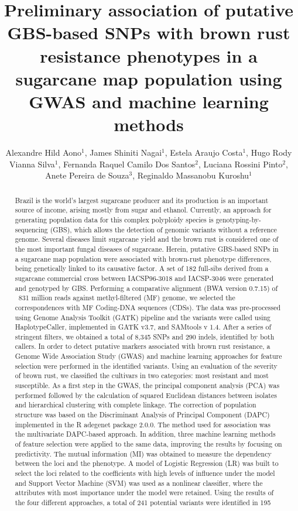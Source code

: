 \documentclass[twoside]{article}
\title{\vspace{-15mm}\fontsize{24pt}{10pt}\selectfont\textbf{Preliminary association of putative GBS-based SNPs with brown rust resistance phenotypes in a sugarcane map population using GWAS and machine learning methods}} %
\author{Alexandre Hild Aono$^1$, James Shiniti Nagai$^1$, Estela Araujo Costa$^1$, Hugo Rody Vianna Silva$^1$, Fernanda Raquel Camilo Dos Santos$^2$, Luciana Rossini Pinto$^2$, Anete Pereira de Souza$^3$, Reginaldo Massanobu Kuroshu$^1$}
\affil{1 UNIFESP\\ 2 INSTITUTO AGRON\^OMICO DE CAMPINAS\\ 3 UNICAMP\\ }
\date{}
\begin{document}
\maketitle %

\thispagestyle{fancy} %


\begin{abstract}
Brazil is the world's largest sugarcane producer and its production is an important source of income, arising mostly from sugar and ethanol. Currently, an approach for generating population data for this complex polyploidy species is genotyping-by-sequencing (GBS), which allows the detection of genomic variants without a reference genome. Several diseases limit sugarcane yield and the brown rust is considered one of the most important fungal diseases of sugarcane. Herein, putative GBS-based SNPs in a sugarcane map population were associated with brown-rust phenotype differences, being genetically linked to its causative factor. A set of 182 full-sibs derived from a sugarcane commercial cross between IACSP96-3018 and IACSP-3046 were generated and genotyped by GBS. Performing a comparative alignment (BWA version 0.7.15) of ~831 million reads against methyl-filtered (MF) genome, we selected the correspondences with MF Coding-DNA sequences (CDSs). The data was pre-processed using Genome Analysis Toolkit (GATK) pipeline and the variants were called using HaplotypeCaller, implemented in GATK v3.7, and SAMtools v 1.4. After a series of stringent filters, we obtained a total of 8,345 SNPs and 290 indels, identified by both callers. In order to detect putative markers associated with brown rust resistance, a Genome Wide Association Study (GWAS) and machine learning approaches for feature selection were performed in the identified variants. Using an evaluation of the severity of brown rust, we classified the cultivars in two categories: most resistant and most susceptible. As a first step in the GWAS, the principal component analysis (PCA) was performed followed by the calculation of squared Euclidean distances between isolates and hierarchical clustering with complete linkage. The correction of population structure was based on the Discriminant Analysis of Principal Component (DAPC) implemented in the R adegenet package 2.0.0. The method used for association was the multivariate DAPC-based approach. In addition, three machine learning methods of feature selection were applied to the same data, improving the results by focusing on predictivity. The mutual information (MI) was obtained to measure the dependency between the loci and the phenotype. A model of Logistic Regression (LR) was built to select the loci related to the coefficients with high levels of influence under the model and Support Vector Machine (SVM) was used as a nonlinear classifier, where the attributes with most importance under the model were retained. Using the results of the four different approaches, a total of 241 potential variants were identified in 195 
\end{abstract}
\end{document}
